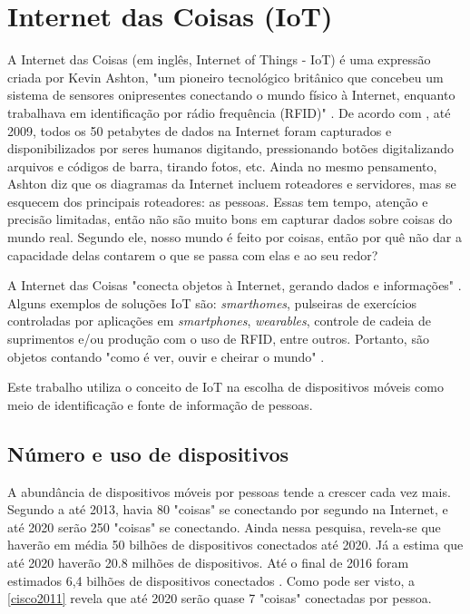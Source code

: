 \section{Internet das Coisas (IoT)}
A Internet das Coisas (em inglês, Internet of Things - IoT) é uma expressão criada por Kevin Ashton,  "um pioneiro tecnológico britânico que concebeu um sistema de sensores onipresentes
conectando o mundo físico à Internet, enquanto trabalhava em identificação por rádio frequência (RFID)" \cite{Amazon2017}. De acordo com
, até 2009, todos os 50 petabytes de dados na Internet foram capturados e disponibilizados por seres humanos digitando,
pressionando botões digitalizando arquivos e códigos de barra, tirando fotos, etc. Ainda no mesmo pensamento, Ashton diz que os diagramas da Internet
incluem roteadores e servidores, mas se esquecem dos principais roteadores: as pessoas. Essas tem tempo, atenção e precisão limitadas, então
não são muito bons em capturar dados sobre coisas do mundo real. Segundo ele, nosso mundo é feito por coisas, então por quê não dar a capacidade
delas contarem o que se passa com elas e ao seu redor?

A Internet das Coisas "conecta objetos à Internet, gerando dados e informações" \cite{Cisco2017}. Alguns exemplos de soluções IoT são:
\emph{smarthomes}, pulseiras de exercícios controladas por aplicações em \emph{smartphones}, \emph{wearables}, controle de cadeia de suprimentos
e/ou produção com o uso de RFID, entre outros. Portanto, são objetos contando "como é ver, ouvir e cheirar o mundo" \cite{Ashton2009}.

Este trabalho utiliza o conceito de IoT na escolha de dispositivos móveis como meio de identificação e fonte de informação de pessoas.

\subsection{Número e uso de dispositivos}

A abundância de dispositivos móveis por pessoas tende a crescer cada vez mais. Segundo a  até 2013, havia 80 "coisas"
se conectando por segundo na Internet, e até 2020 serão 250 "coisas" se conectando. Ainda nessa pesquisa, revela-se que haverão em média
50 bilhões de dispositivos conectados até 2020. Já a  estima que até 2020 haverão 20.8 milhões de dispositivos.
Até o final de 2016 foram estimados 6,4 bilhões de dispositivos conectados \cite{Gartner2014}. Como pode ser visto, a \autoref{cisco2011}
revela que até 2020 serão quase 7 "coisas" conectadas por pessoa.

